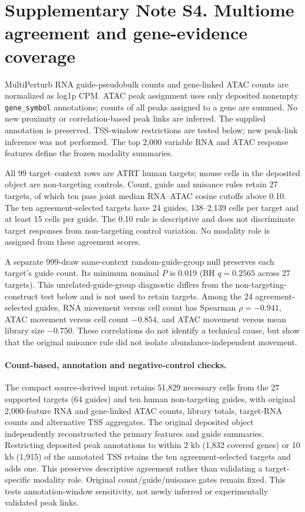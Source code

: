 \documentclass[a4paper,fleqn]{cas-sc}
\makeatletter
\DeclareRobustCommand{\rev}[1]{{\color{red}\def\@citecolor{black}\def\@linkcolor{red}\def\@urlcolor{red}#1}}
\makeatother
\begin{document}
\section*{Supplementary Note S4. Multiome agreement and gene-evidence coverage}

MultiPerturb RNA guide-pseudobulk counts and gene-linked ATAC counts are normalized as log1p CPM. ATAC peak assignment uses only deposited nonempty \texttt{gene\_symbol} annotations; counts of all peaks assigned to a gene are summed. No new proximity or correlation-based peak links are inferred. The supplied annotation is preserved. TSS-window restrictions are tested below; new peak-link inference was not performed. The top 2,000 variable RNA and ATAC response features define the frozen modality summaries.

\rev{All 99 target--context rows are ATRT human targets; mouse cells in the deposited object are non-targeting controls.} \rev{Count, guide and nuisance rules retain 27 targets, of which ten pass joint median RNA--ATAC cosine cutoffs above 0.10.} \rev{The ten agreement-selected targets have 24 guides, 138--2,139 cells per target and at least 15 cells per guide.} \rev{The 0.10 rule is descriptive and does not discriminate target responses from non-targeting control variation.} \rev{No modality role is assigned from these agreement scores.}

\rev{A separate 999-draw same-context random-guide-group null preserves each target's guide count.} \rev{Its minimum nominal $P$ is 0.019 (BH $q=0.2565$ across 27 targets).} \rev{This unrelated-guide-group diagnostic differs from the non-targeting-construct test below and is not used to retain targets.} \rev{Among the 24 agreement-selected guides, RNA movement versus cell count has Spearman $\rho=-0.941$, ATAC movement versus cell count $-0.854$, and ATAC movement versus mean library size $-0.750$.} \rev{These correlations do not identify a technical cause, but show that the original nuisance rule did not isolate abundance-independent movement.}

\paragraph{Count-based, annotation and negative-control checks.}
The compact source-derived input retains 51,829 necessary cells from the 27 supported targets (64 guides) and ten human non-targeting guides, with original 2,000-feature RNA and gene-linked ATAC counts, library totals, target-RNA counts and alternative TSS aggregates. The original deposited object independently reconstructed the primary features and guide summaries. \rev{Restricting deposited peak annotations to within 2 kb (1,832 covered genes) or 10 kb (1,915) of the annotated TSS retains the ten agreement-selected targets and adds one.} \rev{This preserves descriptive agreement rather than validating a target-specific modality role.} Original count/guide/nuisance gates remain fixed. This tests annotation-window sensitivity, not newly inferred or experimentally validated peak links.
\end{document}
